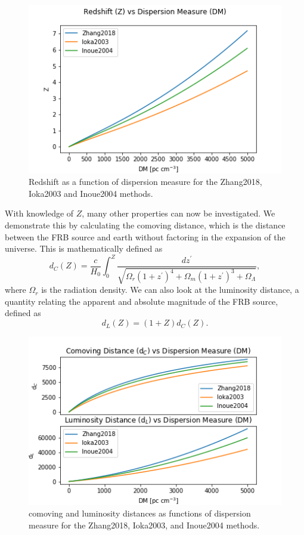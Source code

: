 \documentclass{article}
\begin{document}
\begin{figure}[!htb]
\includegraphics[width=\linewidth]{Z_vs_DM.png}
\caption{Redshift as a function of dispersion measure for the Zhang2018, Ioka2003 and Inoue2004 methods.}
\label{fig:ZvDM}
\end{figure}

With knowledge of $Z$, many other properties can now be investigated. We demonstrate this by calculating the comoving distance, which is the distance between the FRB source and earth without factoring in the expansion of the universe. This is mathematically defined as
\begin{equation}
d_C(Z)=\frac{c}{H_0} \int_0^Z \frac{dz^\prime}{ \sqrt{\Omega_r (1+z^\prime)^4 +\Omega_m (1+z^\prime)^3 + \Omega_\Lambda}  },
\end{equation} 
where $\Omega_r$ is the radiation density. We can also look at the luminosity distance, a quantity relating the apparent and absolute magnitude of the FRB source, defined as
\begin{equation}
d_L(Z)=(1+Z)d_C(Z).
\end{equation}


\begin{figure}[!htb]
\includegraphics[width=\linewidth]{distance_vs_DM.png}
\caption{comoving and luminosity distances as functions of dispersion measure for the Zhang2018, Ioka2003, and Inoue2004 methods. }
\label{fig:distance_v_DM}
\end{figure}
\end{document}
